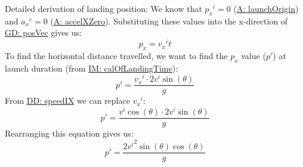 \documentclass[12pt]{article}
\begin{document}
Detailed derivation of landing position:
We know that ${{p_{x}}^{i}}=0$ (\hyperref[launchOrigin]{A: launchOrigin}) and ${{a_{x}}^{c}}=0$ (\hyperref[accelXZero]{A: accelXZero}). Substituting these values into the x-direction of \hyperref[GD:posVec]{GD: posVec} gives us:
\begin{displaymath}
{p_{x}}={{v_{x}}^{i}} t
\end{displaymath}
To find the horizontal distance travelled, we want to find the ${p_{x}}$ value ($p'$) at launch duration (from \hyperref[IM:calOfLandingTime]{IM: calOfLandingTime}):
\begin{displaymath}
p'=\frac{{{v_{x}}^{i}}\cdot{}2 {v^{i}} \sin\left(θ\right)}{g}
\end{displaymath}
From \hyperref[DD:speedIX]{DD: speedIX} we can replace ${{v_{x}}^{i}}$:
\begin{displaymath}
p'=\frac{{v^{i}} \cos\left(θ\right)\cdot{}2 {v^{i}} \sin\left(θ\right)}{g}
\end{displaymath}
Rearranging this equation gives us:
\begin{displaymath}
p'=\frac{2 {v^{i}}^{2} \sin\left(θ\right) \cos\left(θ\right)}{g}
\end{displaymath}
\par~
\end{document}
